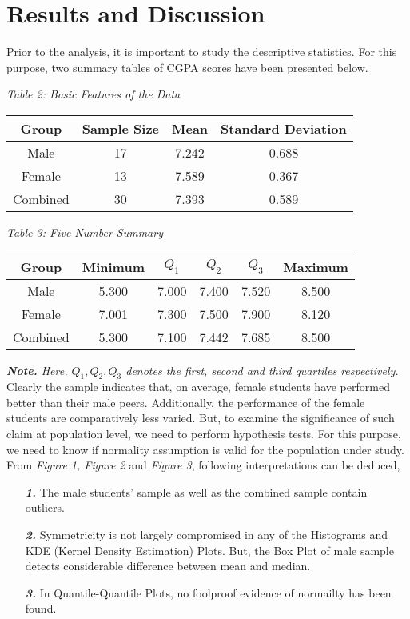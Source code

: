 \documentclass[12pt,a4paper]{report}
\begin{document}
\pagebreak
\section{Results and Discussion}
\justifying
\Large{Prior to the analysis, it is important to study the descriptive statistics. For this purpose, two summary tables of CGPA scores have been presented below.}
\begin{center}
\Large{\textit{Table 2: Basic Features of the Data}}
\begin{table}[hbt!]
\Large
\begin{tabular}{c|c|c|c}
\hline
Group & Sample Size & Mean & Standard Deviation\\
\hline
Male & 17 & 7.242 & 0.688\\
Female  & 13 & 7.589 & 0.367\\
Combined & 30 & 7.393 & 0.589\\
\hline
\end{tabular}
\end{table}
\end{center}
\begin{center}
\Large{\textit{Table 3: Five Number Summary}}
\begin{table}[hbt!]
\Large
\begin{tabular}{c|c|c|c|c|c}
\hline
Group & Minimum & $Q_1$ & $Q_2$ & $Q_3$ & Maximum\\
\hline
Male & 5.300 & 7.000 & 7.400 & 7.520 & 8.500\\
Female & 7.001 & 7.300 & 7.500 & 7.900 & 8.120\\
Combined & 5.300 & 7.100 & 7.442 & 7.685 & 8.500\\
\hline
\end{tabular}
\end{table}
\end{center}
\large{\textit{{\textbf{Note.}} Here, $Q_1, Q_2, Q_3$ denotes the first, second and third quartiles respectively.}}\\[10pt]
\Large{Clearly the sample indicates that, on average, female students have performed better than their male peers. Additionally, the performance of the female students are comparatively less varied. But, to examine the significance of such claim at population level, we need to perform hypothesis tests. For this purpose, we need to know if normality assumption is valid for the population under study.}\\
\Large{From \textit{Figure 1, Figure 2} and \textit{Figure 3}, following interpretations can be deduced,}
\begin{enumerate}
   \item[\Large{\textbf{\textit{1.}}}]
   \Large{The male students' sample as well as the combined sample contain outliers.}
   \item[\Large{\textbf{\textit{2.}}}]
   \Large{Symmetricity is not largely compromised in any of the Histograms and KDE (Kernel Density Estimation) Plots. But, the Box Plot of male sample detects considerable difference between mean and median.}
   \item[\Large{\textbf{\textit{3.}}}]
   \Large{In Quantile-Quantile Plots, no foolproof evidence of normailty has been found.}
\end{enumerate}
\end{document}
